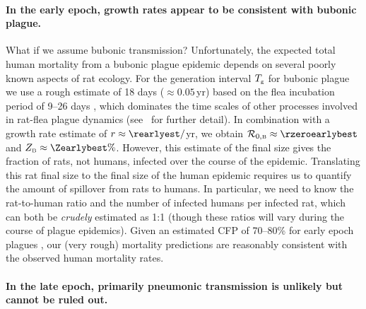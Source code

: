 \paragraph{In the early epoch, growth rates appear to be consistent with bubonic plague.}

What if we assume bubonic transmission? Unfortunately, the expected total human mortality from a bubonic plague epidemic depends on several poorly known aspects of rat ecology. For the generation interval $T_{\mbox{\tiny g}}$ for bubonic plague we use a rough estimate of 18 days ($\approx 0.05\,$yr) based on the flea incubation period of 9--26 days \cite{LaPerriere+2009}, which dominates the time scales of other processes involved in rat-flea plague dynamics (see \supp\ for further detail). In combination with a growth rate estimate of $r \approx \rearlyest/$yr, we obtain $\rzerob \approx \rzeroearlybest$ and $\Zb \approx \Zearlybest\%$. However, this estimate of the final size gives the fraction of rats, not humans, infected over the course of the epidemic. Translating this rat final size to the final size of the human epidemic requires us to quantify the amount of spillover from rats to humans. In particular, we need to know the rat-to-human ratio and the number of infected humans per infected rat, which can both be \emph{crudely} estimated as 1:1 \cite{KeelGill00b} (though these ratios will vary during the course of plague epidemics).  
Given an estimated CFP of 70--80\% for early epoch plagues \cite{McEv88}, our (very rough) mortality predictions are reasonably consistent with the observed human mortality rates.

\paragraph{In the late epoch, primarily pneumonic transmission is unlikely but cannot be ruled out.}

